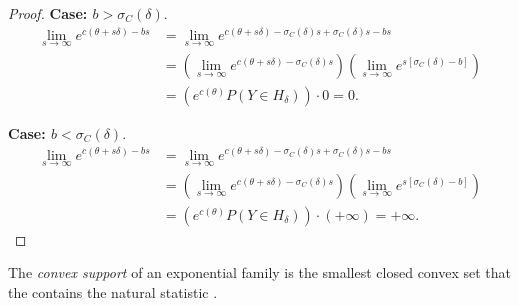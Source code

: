 \begin{proof}
\textbf{Case: $b > \sigma_C(\delta)$}.
\begin{align*}
	\lim_{s\to \infty} e^{ c(\theta + s \delta ) - bs } &= 
	\lim_{s\to \infty} e^{ c(\theta + s \delta ) - \sigma_C(\delta)s + \sigma_C
(\delta)s - bs }  \\
	&= \left( \lim_{s\to \infty} e^{ c(\theta + s \delta ) - \sigma_C(\delta)s} 
\right ) \left(  \lim_{s\to \infty} e^{ s[ \sigma_C(\delta) - b] } \right )\\
	&= \left (e^{c(\theta) }P(Y\in H_\delta) \right ) \cdot 0 = 0.
\end{align*}

\textbf{Case: $b < \sigma_C(\delta)$}.
\begin{align*}
	\lim_{s\to \infty} e^{ c(\theta + s \delta ) - bs } &= 
	\lim_{s\to \infty} e^{ c(\theta + s \delta ) - \sigma_C(\delta)s + \sigma_C
(\delta)s - bs }  \\
	&= \left( \lim_{s\to \infty} e^{ c(\theta + s \delta ) - \sigma_C(\delta)s} 
\right ) \left(  \lim_{s\to \infty} e^{ s[ \sigma_C(\delta) - b] } \right )\\
	&= \left (e^{c(\theta) }P(Y\in H_\delta) \right ) \cdot \left ( + \infty \right ) 
= + \infty.
\end{align*}
\end{proof}

The \emph{convex support} of an exponential family is the smallest closed convex set 
that the contains the natural statistic \citep{Geyer:gdor}.

